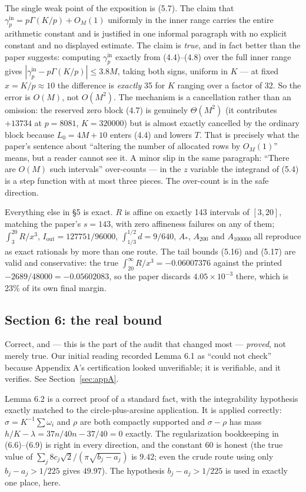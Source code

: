 \documentclass[11pt]{article}
\theoremstyle{definition}
\newcommand{\gin}{\gamma_p^{\mathrm{in}}}
\newcommand{\Iout}{I_{\mathrm{out}}}
\begin{document}
The single weak point of the exposition is (5.7). The claim that
$\gin=p\Gamma(K/p)+O_M(1)$ uniformly in the inner range carries the entire arithmetic constant
and is justified in one informal paragraph with no explicit constant and no displayed estimate.
The claim is \emph{true}, and in fact better than the paper suggests: computing $\gin$ exactly
from (4.4)--(4.8) over the full inner range gives
$|\gin-p\Gamma(K/p)|\le3.8M$, taking both signs, uniform in $K$ --- at fixed $x=K/p\approx10$
the difference is \emph{exactly} 35 for $K$ ranging over a factor of 32. So the error is $O(M)$,
not $O(M^2)$. The mechanism is a cancellation rather than an omission: the reserved zero block
(4.7) is genuinely $\Theta(M^2)$ (it contributes $+13734$ at $p=8081$, $K=320000$) but is almost
exactly cancelled by the ordinary block because $L_0=4M+10$ enters (4.4) and lowers $T$. That is
precisely what the paper's sentence about ``altering the number of allocated rows by $O_M(1)$''
means, but a reader cannot see it. A minor slip in the same paragraph: ``There are $O(M)$ such
intervals'' over-counts --- in the $z$ variable the integrand of (5.4) is a step function with
at most three pieces. The over-count is in the safe direction.

Everything else in \S5 is exact. $R$ is affine on exactly 143 intervals of $[3,20]$, matching
the paper's $s=143$, with zero affineness failures on any of them; $\int_3^{20}R/x^3$,
$\Iout=127751/96000$, $\int_{1/3}^{1/2}d=9/640$, $A_*$, $A_{200}$ and $A_{100000}$ all reproduce
as exact rationals by more than one route. The tail bounds (5.16) and (5.17) are valid and
conservative: the true $\int_{20}^\infty R/x^3=-0.06007376$ against the printed
$-2689/48000=-0.05602083$, so the paper discards $4.05\times10^{-3}$ there, which is 23\% of its
own final margin.

\subsection{Section 6: the real bound}

Correct, and --- this is the part of the audit that changed most --- \emph{proved}, not merely
true. Our initial reading recorded Lemma 6.1 as ``could not check'' because Appendix A's
certification looked unverifiable; it is verifiable, and it verifies. See
Section~\ref{sec:appA}.

Lemma 6.2 is a correct proof of a standard fact, with the integrability hypothesis exactly
matched to the circle-plus-arcsine application. It is applied correctly: $\sigma=K^{-1}\sum\omega_i$
and $\rho$ are both compactly supported and $\sigma-\rho$ has mass
$h/K-\lambda=37n/40n-37/40=0$ exactly. The regularization bookkeeping in (6.6)--(6.9) is right
in every direction, and the constant 60 is honest (the true value of
$\sum_j8c_j\sqrt2/(\pi\sqrt{b_j-a_j})$ is $9.42$; even the crude route using only
$b_j-a_j>1/225$ gives $49.97$). The hypothesis $b_j-a_j>1/225$ is used in exactly one place, here.
\end{document}
